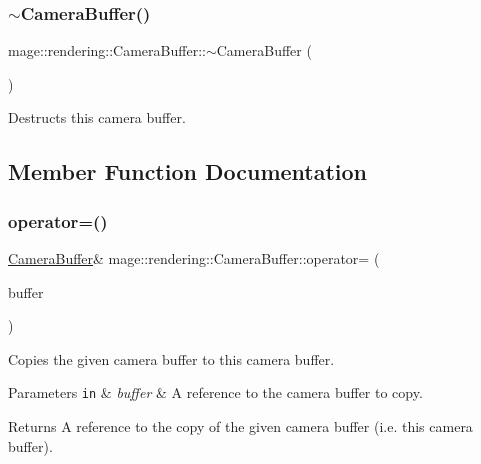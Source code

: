 \subsubsection{\texorpdfstring{$\sim$\+Camera\+Buffer()}{~CameraBuffer()}}
{\footnotesize\ttfamily mage\+::rendering\+::\+Camera\+Buffer\+::$\sim$\+Camera\+Buffer (\begin{DoxyParamCaption}{ }\end{DoxyParamCaption})\hspace{0.3cm}{\ttfamily [default]}}

Destructs this camera buffer. 

\subsection{Member Function Documentation}
\hypertarget{structmage_1_1rendering_1_1_camera_buffer_a5c0b3a1e054ebcb4597f313c0346da57}{}\label{structmage_1_1rendering_1_1_camera_buffer_a5c0b3a1e054ebcb4597f313c0346da57} 
\subsubsection{\texorpdfstring{operator=()}{operator=()}\hspace{0.1cm}{\footnotesize\ttfamily [1/2]}}
{\footnotesize\ttfamily \hyperlink{structmage_1_1rendering_1_1_camera_buffer}{Camera\+Buffer}\& mage\+::rendering\+::\+Camera\+Buffer\+::operator= (\begin{DoxyParamCaption}\item[{const \hyperlink{structmage_1_1rendering_1_1_camera_buffer}{Camera\+Buffer} \&}]{buffer }\end{DoxyParamCaption})\hspace{0.3cm}{\ttfamily [default]}}

Copies the given camera buffer to this camera buffer.


\begin{DoxyParams}[1]{Parameters}
\mbox{\tt in}  & {\em buffer} & A reference to the camera buffer to copy. \\
\hline
\end{DoxyParams}
\begin{DoxyReturn}{Returns}
A reference to the copy of the given camera buffer (i.\+e. this camera buffer). 
\end{DoxyReturn}
\hypertarget{structmage_1_1rendering_1_1_camera_buffer_a12658ff989daac2e910b91633ac0223d}{}\label{structmage_1_1rendering_1_1_camera_buffer_a12658ff989daac2e910b91633ac0223d} 
